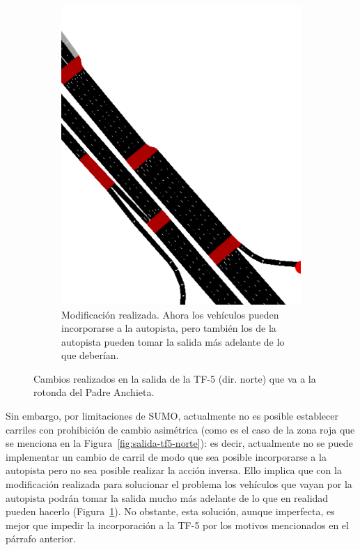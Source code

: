 \begin{figure}[ht]
\begin{subfigure}[t]{0.48\textwidth}
      \includegraphics[width=\textwidth]{report/images/netedit.-tf5-norte-bien.png}
      \caption{Modificación realizada. Ahora los vehículos pueden incorporarse a la autopista, pero también los de la autopista pueden tomar la salida más adelante de lo que deberían.}
      \label{fig:netedit-tf5-norte-bien}
    \end{subfigure}%
    \caption{Cambios realizados en la salida de la TF-5 (dir. norte) que va a la rotonda del Padre Anchieta.}
    \label{fig:netedit-tf5-problema}
\end{figure}

Sin embargo, por limitaciones de SUMO, actualmente no es posible establecer carriles con prohibición de cambio asimétrica (como es el caso de la zona roja que se menciona en la Figura~\ref{fig:salida-tf5-norte}): es decir, actualmente no se puede implementar un cambio de carril de modo que sea posible incorporarse a la autopista pero no sea posible realizar la acción inversa. Ello implica que con la modificación realizada para solucionar el problema los vehículos que vayan por la autopista podrán tomar la salida mucho más adelante de lo que en realidad pueden hacerlo (Figura~\ref{fig:netedit-tf5-norte-bien}). No obstante, esta solución, aunque imperfecta, es mejor que impedir la incorporación a la TF-5 por los motivos mencionados en el párrafo anterior.

